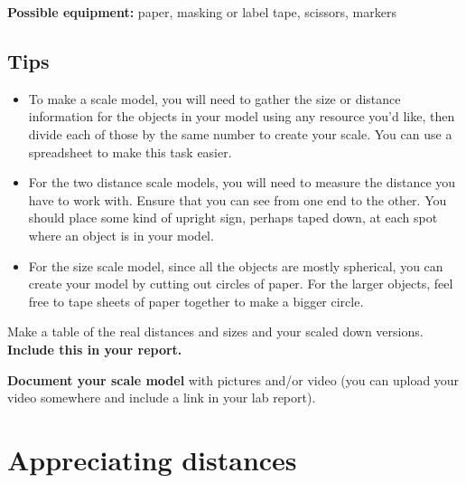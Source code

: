 \textbf{Possible equipment:} paper, masking or label tape, scissors, markers


\subsection{Tips}
\begin{itemize}
	\item To make a scale model, you will need to gather the size or distance information for the objects in your model using any resource you'd like, then divide each of those by the same number to create your scale. You can use a spreadsheet to make this task easier.
	
	\item For the two distance scale models, you will need to measure the distance you have to work with. %
	Ensure that you can see from one end to the other.
	You should place some kind of upright sign, perhaps taped down, at each spot where an object is in your model.
	
	\item For the size scale model, since all the objects are mostly spherical, you can create your model by cutting out circles of paper. For the larger objects, feel free to tape sheets of paper together to make a bigger circle.
\end{itemize}

\begin{steps}
	\item Make a table of the real distances and sizes and your scaled down versions. \textbf{Include this in your report.}
	
	\item \textbf{Document your scale model} with pictures and/or video (you can upload your video somewhere and include a link in your lab report).
\end{steps}

\section{Appreciating distances}\label{se:sec:calc}

